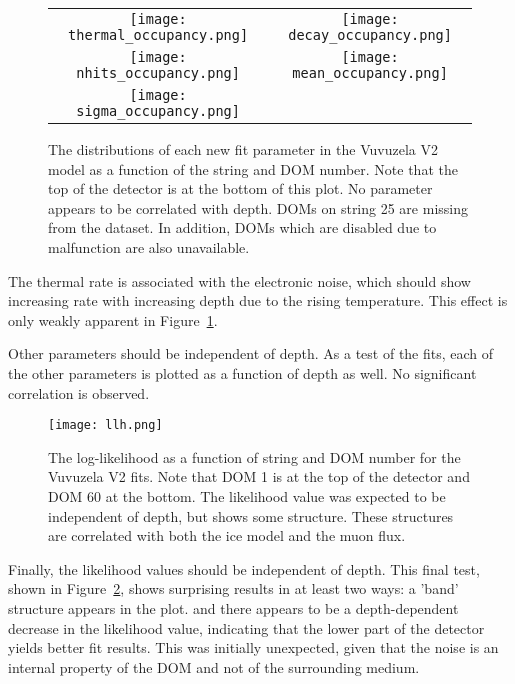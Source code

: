 \begin{figure}[h]
\centering
\begin{tabular}{cc}
  	\texttt{[image: thermal\_occupancy.png]} &
	\texttt{[image: decay\_occupancy.png]} \\

  	\texttt{[image: nhits\_occupancy.png]} &
	\texttt{[image: mean\_occupancy.png]} \\

  	\texttt{[image: sigma\_occupancy.png]} & 
  	\\
\end{tabular}	
\caption{The distributions of each new fit parameter in the Vuvuzela V2 model as a function of the string and DOM number. Note that the top of the detector is at the bottom of this plot. No parameter appears to be correlated with depth. DOMs on string 25 are missing from the dataset. In addition, DOMs which are disabled due to malfunction are also unavailable.}
\label{fig:vuvuzela_params_occupancy}
\end{figure}

The thermal rate is associated with the electronic noise, which should show increasing rate with increasing depth due to the rising temperature.
This effect is only weakly apparent in Figure~\ref{fig:vuvuzela_params_occupancy}.

Other parameters should be independent of depth.
As a test of the fits, each of the other parameters is plotted as a function of depth as well.
No significant correlation is observed.

\begin{figure}
\centering
\texttt{[image: llh.png]} 
\caption{The log-likelihood as a function of string and DOM number for the Vuvuzela V2 fits. Note that DOM 1 is at the top of the detector and DOM 60 at the bottom. The likelihood value was expected to be independent of depth, but shows some structure. These structures are correlated with both the ice model and the muon flux.}
\label{fig:llh_vs_depth}
\end{figure}

Finally, the likelihood values should be independent of depth.
This final test, shown in Figure~\ref{fig:llh_vs_depth},  shows surprising results in at least two ways:
a 'band' structure appears in the plot. and there appears to be a depth-dependent decrease in the likelihood value, indicating that the lower part of the detector yields better fit results.
This was initially unexpected, given that the noise is an internal property of the DOM and not of the surrounding medium.

